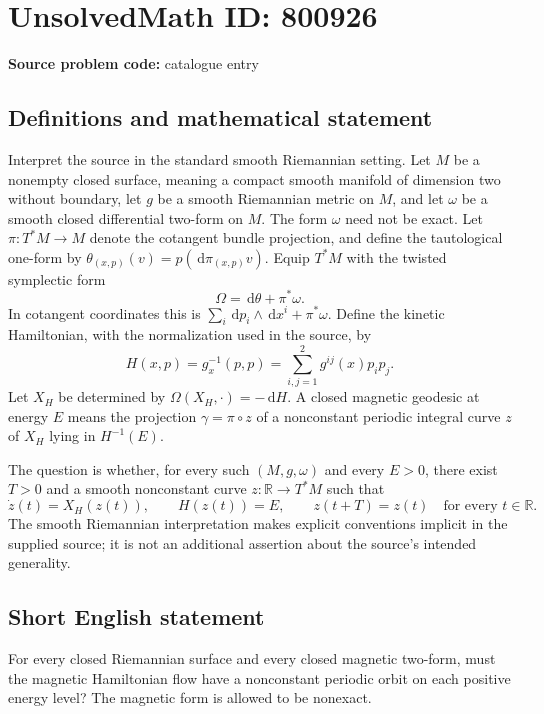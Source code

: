 \documentclass[11pt]{article}
\newcommand{\R}{\mathbb{R}}
\newcommand{\dd}{\,\mathrm{d}}
\begin{document}
\section*{UnsolvedMath ID: 800926}
\textbf{Source problem code:} catalogue entry
\subsection{Definitions and mathematical statement}
Interpret the source in the standard smooth Riemannian setting. Let \(M\) be a nonempty closed surface, meaning a compact smooth manifold of dimension two without boundary, let \(g\) be a smooth Riemannian metric on \(M\), and let \(\omega\) be a smooth closed differential two-form on \(M\). The form \(\omega\) need not be exact. Let \(\pi:T^*M\to M\) denote the cotangent bundle projection, and define the tautological one-form by \(\theta_{(x,p)}(v)=p(\dd\pi_{(x,p)}v)\). Equip \(T^*M\) with the twisted symplectic form
\[
\Omega=\dd\theta+\pi^*\omega.
\]
In cotangent coordinates this is \(\sum_i\dd p_i\wedge\dd x^i+\pi^*\omega\). Define the kinetic Hamiltonian, with the normalization used in the source, by
\[
H(x,p)=g_x^{-1}(p,p)=\sum_{i,j=1}^{2}g^{ij}(x)p_ip_j.
\]
Let \(X_H\) be determined by \(\Omega(X_H,\cdot)=-\dd H\). A closed magnetic geodesic at energy \(E\) means the projection \(\gamma=\pi\circ z\) of a nonconstant periodic integral curve \(z\) of \(X_H\) lying in \(H^{-1}(E)\).

The question is whether, for every such \((M,g,\omega)\) and every \(E>0\), there exist \(T>0\) and a smooth nonconstant curve \(z:\R\to T^*M\) such that
\[
\dot z(t)=X_H(z(t)),\qquad H(z(t))=E,\qquad z(t+T)=z(t)
\quad\text{for every }t\in\R.
\]
The smooth Riemannian interpretation makes explicit conventions implicit in the supplied source; it is not an additional assertion about the source's intended generality.
\subsection{Short English statement}
For every closed Riemannian surface and every closed magnetic two-form, must the magnetic Hamiltonian flow have a nonconstant periodic orbit on each positive energy level? The magnetic form is allowed to be nonexact.
\end{document}
